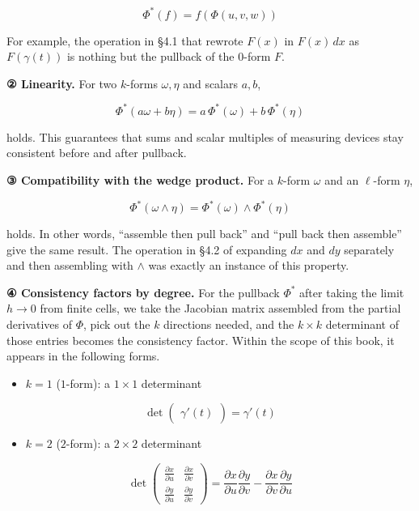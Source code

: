 \[\Phi^*(f) = f(\Phi(u,v,w))\]

For example, the operation in §4.1 that rewrote \(F(x)\) in \(F(x)\,dx\)
as \(F(\gamma(t))\) is nothing but the pullback of the \(0\)-form \(F\).

\textbf{② Linearity.} For two \(k\)-forms \(\omega, \eta\) and scalars
\(a,b\),

\[\Phi^*(a\omega + b\eta) = a\,\Phi^*(\omega) + b\,\Phi^*(\eta)\]

holds. This guarantees that sums and scalar multiples of measuring
devices stay consistent before and after pullback.

\textbf{③ Compatibility with the wedge product.} For a \(k\)-form
\(\omega\) and an \(\ell\)-form \(\eta\),

\[\Phi^*(\omega \wedge \eta) = \Phi^*(\omega) \wedge \Phi^*(\eta)\]

holds. In other words, ``assemble then pull back'' and ``pull back then
assemble'' give the same result. The operation in §4.2 of expanding
\(dx\) and \(dy\) separately and then assembling with \(\wedge\) was
exactly an instance of this property.

\textbf{④ Consistency factors by degree.} For the pullback \(\Phi^*\)
after taking the limit \(h\to0\) from finite cells, we take the Jacobian
matrix assembled from the partial derivatives of \(\Phi\), pick out the
\(k\) directions needed, and the \(k \times k\) determinant of those
entries becomes the consistency factor. Within the scope of this book,
it appears in the following forms.

\begin{itemize}
\tightlist
\item
  \(k=1\) (\(1\)-form): a \(1 \times 1\) determinant
\end{itemize}

\[
\det
\begin{pmatrix}
\gamma'(t)
\end{pmatrix}
=
\gamma'(t)
\]

\begin{itemize}
\tightlist
\item
  \(k=2\) (\(2\)-form): a \(2 \times 2\) determinant
\end{itemize}

\[
\det
\begin{pmatrix}
\frac{\partial x}{\partial u} & \frac{\partial x}{\partial v}\\[4pt]
\frac{\partial y}{\partial u} & \frac{\partial y}{\partial v}
\end{pmatrix}
=
\frac{\partial x}{\partial u}\frac{\partial y}{\partial v}
-
\frac{\partial x}{\partial v}\frac{\partial y}{\partial u}
\]

